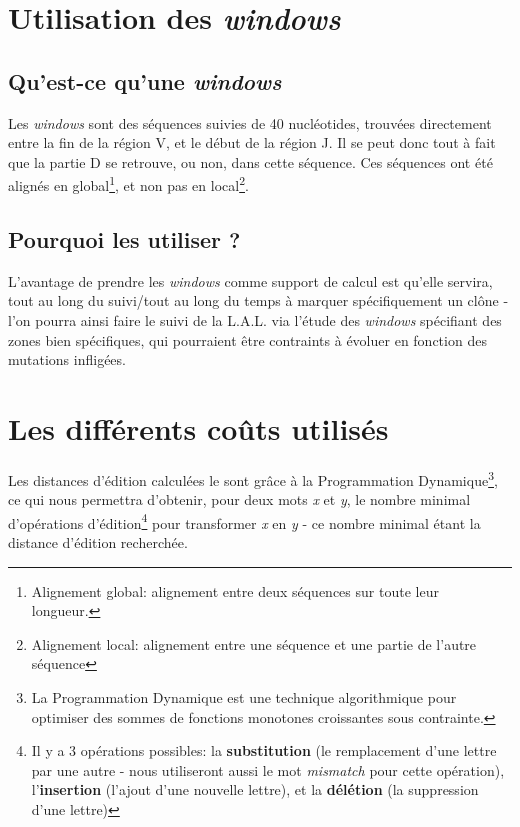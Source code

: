 \documentclass[12pt]{report}
\begin{document}
\begin{spacing}{1.2}
\section{Utilisation des \textit{windows}}

\subsection{Qu'est-ce qu'une \textit{windows}}

Les \textit{windows} sont des séquences suivies de 40 nucléotides, trouvées directement entre la fin de la région V, et le début de la région J. Il se peut donc tout à fait que la partie D se retrouve, ou non, dans cette séquence.
\newline
Ces séquences ont été alignés en global\footnote{Alignement global: alignement entre deux séquences sur toute leur longueur.}, et non pas en local\footnote{Alignement local: alignement entre une séquence et une partie de l'autre séquence}.

\subsection{Pourquoi les utiliser ?}

L'avantage de prendre les \textit{windows} comme support de calcul est qu'elle servira, tout au long du suivi/tout au long du temps à marquer spécifiquement un clône - l'on pourra ainsi faire le suivi de la L.A.L. via l'étude des \textit{windows} spécifiant des zones bien spécifiques, qui pourraient être contraints à évoluer en fonction des mutations infligées.

\section{Les différents coûts utilisés}

Les distances d'édition calculées le sont grâce à la Programmation Dynamique\footnote{La Programmation Dynamique est une technique algorithmique pour optimiser des sommes de fonctions monotones croissantes sous contrainte.}, ce qui nous permettra d'obtenir, pour deux mots \textit{x} et \textit{y}, le nombre minimal d’opérations d’édition\footnote{Il y a 3 opérations possibles: la \textbf{substitution} (le remplacement d'une lettre par une autre - nous utiliseront aussi le mot \textit{mismatch} pour cette opération), l'\textbf{insertion} (l'ajout d'une nouvelle lettre), et la \textbf{délétion} (la suppression d'une lettre)} pour transformer \textit{x} en \textit{y} - ce nombre minimal étant la distance d'édition recherchée.


\end{spacing}
\end{document}
